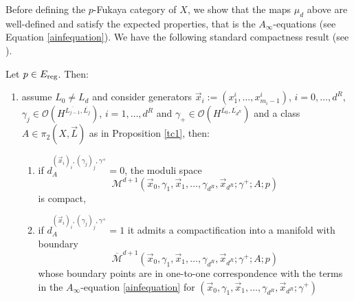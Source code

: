 	
	Before defining the $p$-Fukaya category of $X$, we show that the maps $\mu_d$ above are well-defined and satisfy the expected properties, that is the $A_\infty$-equations (see Equation \ref{ainfequation}). We have the following standard compactness result (see \cite{Se:book-fukaya-categ, Charest2012SourceComplexes,Bi-Co:rigidity}). 
	\begin{prop}\label{cc1}
		Let $p\in E_\textnormal{reg}$. Then: \begin{enumerate}
			\item assume $L_0\neq L_d$ and consider generators $\vec{x}_i:=(x^i_1,\ldots,x^i_{m_i-1})$, $i=0,\ldots,d^R$, $\gamma_j\in \mathcal{O}\left(H^{\overline{L_{j-1}},\overline{L_j}}\right)$, $i=1,\ldots,d^R$ and $\gamma_+\in \mathcal{O}\left(H^{\overline{L_0},\overline{L_{d^R}}}\right)$ and a class $A\in \pi_2(X,\vec{L})$ as in Proposition \ref{tc1}, then:
			\begin{enumerate}
				\item if $d_{A}^{(\vec{x}_i)_i, (\gamma_j)_j,\gamma^+}=0$, the moduli space $$\mathcal{M}^{d+1}\left(\vec{x}_0, \gamma_1, \vec{x}_1,\ldots,\gamma_{d^R}, \vec{x}_{d^R}; \gamma^+;A;p\right)$$ is compact,
				\item if $d_{A}^{(\vec{x}_i)_i, (\gamma_j)_j,\gamma^+}=1$ it admits a compactification into a manifold with  boundary $$\overline{\mathcal{M}}^{d+1}\left(\vec{x}_0, \gamma_1, \vec{x}_1,\ldots,\gamma_{d^R}, \vec{x}_{d^R}; \gamma^+;A;p\right)$$ whose boundary points are in one-to-one correspondence with the terms in the $A_\infty$-equation \ref{ainfequation} for $(\vec{x}_0, \gamma_1, \vec{x}_1,\ldots,\gamma_{d^R}, \vec{x}_{d^R}; \gamma^+)$
			\end{enumerate}

\end{enumerate}
\end{prop}
